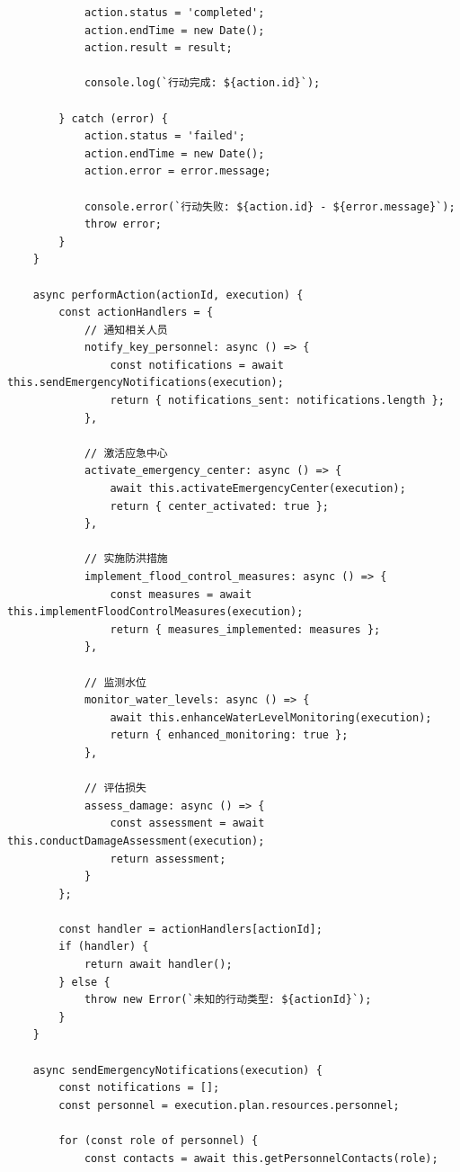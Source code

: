 \begin{lstlisting}
            action.status = 'completed';
            action.endTime = new Date();
            action.result = result;
            
            console.log(`行动完成: ${action.id}`);
            
        } catch (error) {
            action.status = 'failed';
            action.endTime = new Date();
            action.error = error.message;
            
            console.error(`行动失败: ${action.id} - ${error.message}`);
            throw error;
        }
    }
    
    async performAction(actionId, execution) {
        const actionHandlers = {
            // 通知相关人员
            notify_key_personnel: async () => {
                const notifications = await this.sendEmergencyNotifications(execution);
                return { notifications_sent: notifications.length };
            },
            
            // 激活应急中心
            activate_emergency_center: async () => {
                await this.activateEmergencyCenter(execution);
                return { center_activated: true };
            },
            
            // 实施防洪措施
            implement_flood_control_measures: async () => {
                const measures = await this.implementFloodControlMeasures(execution);
                return { measures_implemented: measures };
            },
            
            // 监测水位
            monitor_water_levels: async () => {
                await this.enhanceWaterLevelMonitoring(execution);
                return { enhanced_monitoring: true };
            },
            
            // 评估损失
            assess_damage: async () => {
                const assessment = await this.conductDamageAssessment(execution);
                return assessment;
            }
        };
        
        const handler = actionHandlers[actionId];
        if (handler) {
            return await handler();
        } else {
            throw new Error(`未知的行动类型: ${actionId}`);
        }
    }
    
    async sendEmergencyNotifications(execution) {
        const notifications = [];
        const personnel = execution.plan.resources.personnel;
        
        for (const role of personnel) {
            const contacts = await this.getPersonnelContacts(role);
            

\end{lstlisting}
